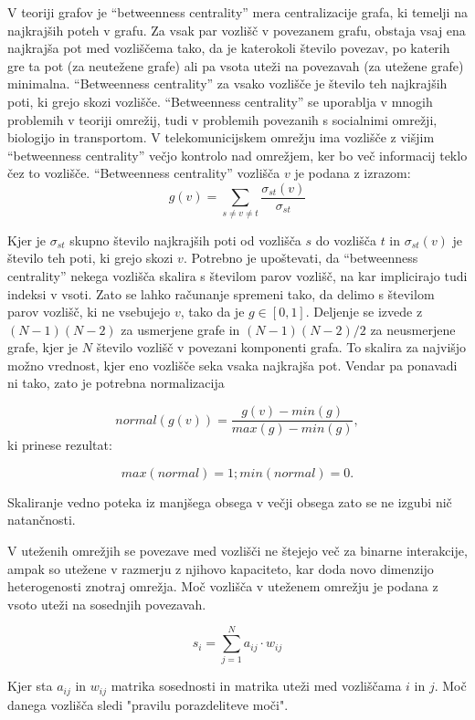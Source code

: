 \documentclass[12pt,a4paper]{amsart}
\begin{document}
V teoriji grafov je “betweenness centrality” mera centralizacije grafa, ki temelji na najkrajših poteh v grafu. Za vsak par vozlišč v povezanem grafu, obstaja vsaj ena najkrajša pot med vozliščema tako, da je katerokoli število povezav, po katerih gre ta pot (za neutežene grafe) ali pa vsota uteži na povezavah (za utežene grafe) minimalna. “Betweenness centrality” za vsako vozlišče je število teh najkrajših poti, ki grejo skozi vozlišče. “Betweenness centrality” se uporablja v mnogih problemih v teoriji omrežij, tudi v problemih povezanih s socialnimi omrežji, biologijo in transportom. V telekomunicijskem omrežju ima vozlišče z višjim “betweenness centrality” večjo kontrolo nad omrežjem, ker bo več informacij teklo čez to vozlišče. “Betweenness centrality” vozlišča $v$ je podana z izrazom:
$$g(v) = \sum_{s \ne v \ne t}^{ } \frac{\sigma_{st} (v)}{\sigma_{st}}$$

Kjer je $\sigma_{st}$ skupno število najkrajših poti od vozlišča $s$ do vozlišča $t$ in $\sigma_{st} (v)$ je število teh poti, ki grejo skozi $v$. Potrebno je upoštevati, da “betweenness centrality” nekega vozlišča skalira s številom parov vozlišč, na kar implicirajo tudi indeksi v vsoti. Zato se lahko računanje spremeni tako, da delimo s številom parov vozlišč, ki ne vsebujejo $v$, tako da je $g \in [0, 1]$.  Deljenje se izvede z $(N - 1)(N - 2)$ za usmerjene grafe in $(N - 1)(N - 2)/2$ za neusmerjene grafe, kjer je $N$ število vozlišč v povezani komponenti grafa. To skalira za najvišjo možno vrednost, kjer eno vozlišče seka vsaka najkrajša pot. Vendar pa ponavadi ni tako, zato je potrebna normalizacija 

$$normal(g(v)) = \frac{g(v) - min(g)}{max(g) - min(g)},$$
ki prinese rezultat: 

$$max(normal) = 1; min(normal) = 0.$$

Skaliranje vedno poteka iz manjšega obsega v večji obsega zato se ne izgubi nič natančnosti.

V uteženih omrežjih se povezave med vozlišči ne štejejo več za binarne interakcije, ampak so utežene v razmerju z njihovo kapaciteto, kar doda novo dimenzijo heterogenosti znotraj  omrežja. Moč vozlišča v uteženem omrežju je podana z vsoto uteži na sosednjih povezavah. 

$$s_i = \sum_{j=1}^{N} a_{ij} \cdot w_{ij}$$

Kjer sta $a_{ij}$  in $w_{ij}$ matrika sosednosti in matrika uteži med vozliščama $i$ in $j$. Moč danega vozlišča sledi "pravilu porazdeliteve moči".
\end{document}
